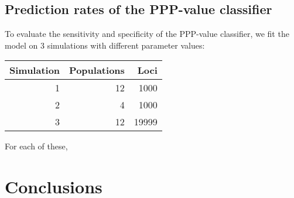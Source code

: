 \documentclass[a4paper,12pt]{article}
\begin{document}
\subsection{Prediction rates of the PPP-value classifier}

To evaluate the sensitivity and specificity of the PPP-value
classifier, we fit the model on 3 simulations with different parameter
values:

\begin{tabular}{rrr}
  Simulation & Populations & Loci \\
  \hline
  1 & 12 & 1000 \\
  2 & 4 & 1000\\
  3 & 12 & 19999
\end{tabular}

For each of these, 



\section{Conclusions}



\end{document}
